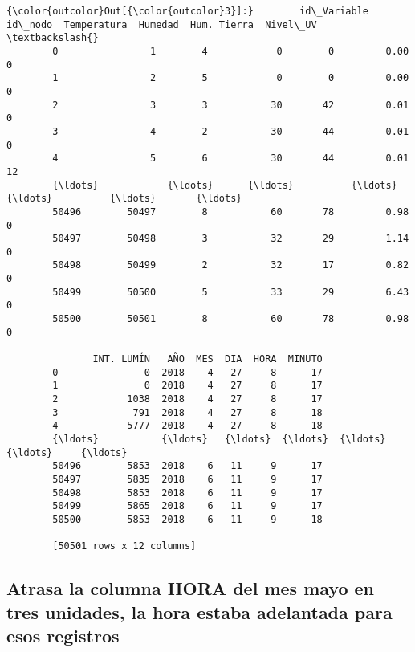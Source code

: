 \documentclass[11pt]{article}
\begin{document}
\begin{Verbatim}[commandchars=\\\{\}]
{\color{outcolor}Out[{\color{outcolor}3}]:}        id\_Variable  id\_nodo  Temperatura  Humedad  Hum. Tierra  Nivel\_UV  \textbackslash{}
        0                1        4            0        0         0.00         0   
        1                2        5            0        0         0.00         0   
        2                3        3           30       42         0.01         0   
        3                4        2           30       44         0.01         0   
        4                5        6           30       44         0.01        12   
        {\ldots}            {\ldots}      {\ldots}          {\ldots}      {\ldots}          {\ldots}       {\ldots}   
        50496        50497        8           60       78         0.98         0   
        50497        50498        3           32       29         1.14         0   
        50498        50499        2           32       17         0.82         0   
        50499        50500        5           33       29         6.43         0   
        50500        50501        8           60       78         0.98         0   
        
               INT. LUMÍN   AÑO  MES  DIA  HORA  MINUTO  
        0               0  2018    4   27     8      17  
        1               0  2018    4   27     8      17  
        2            1038  2018    4   27     8      17  
        3             791  2018    4   27     8      18  
        4            5777  2018    4   27     8      18  
        {\ldots}           {\ldots}   {\ldots}  {\ldots}  {\ldots}   {\ldots}     {\ldots}  
        50496        5853  2018    6   11     9      17  
        50497        5835  2018    6   11     9      17  
        50498        5853  2018    6   11     9      17  
        50499        5865  2018    6   11     9      17  
        50500        5853  2018    6   11     9      18  
        
        [50501 rows x 12 columns]
\end{Verbatim}
            
    \subsection{Atrasa la columna HORA del mes mayo en tres unidades, la
hora estaba adelantada para esos
registros}\label{atrasa-la-columna-hora-del-mes-mayo-en-tres-unidades-la-hora-estaba-adelantada-para-esos-registros}
\end{document}
